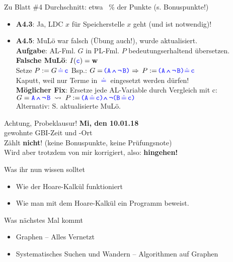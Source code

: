 \begin{frame}{Zu Blatt \#4}
	Durchschnitt: \quad etwa ~\% der Punkte (s. Bonuspunkte!)
	\begin{itemize}
		\item \textbf{A4.3}: Ja, LDC $x$ für Speicherstelle $x$ geht (und ist notwendig)!
		\item \textbf{A4.5}: MuLö war falsch (Übung auch!), wurde aktualisiert. \\
			  \textbf{Aufgabe}: \; AL-Fml. $G$ in PL-Fml. $P$ bedeutungserhaltend übersetzen. \\ 
			  \pause
			  \textbf{Falsche MuLö}: \; $I(\hbox{\textcolor{blue}{\texttt{c}}}) = \hbox{\textbf{w}}$ \\
			  \quad Setze $P := G \pleq \word c$ \qquad Bsp.: \; $G = \plka \word A \aland \alnot \word B \plkz \impl P := \plka \word A \aland \alnot \word B \plkz \pleq \word c$ \\ 
				  \pause 
				  \quad \impl Kaputt, weil nur Terme in $\pleq$ eingesetzt werden dürfen! \\
			  \pause
			  \textbf{Möglicher Fix}: \; Ersetze jede AL-Variable durch Vergleich mit \word c: \\
			  \quad $G = \word A \aland \alnot \word B \; \?> \; P := \plka \word A \pleq \word c\plkz \aland \alnot \plka \word B \pleq \word c\plkz$ \\
			  Alternativ: S. aktualisierte MuLö.
	\end{itemize}
\end{frame}

\begin{frame}{Achtung, Probeklausur!}
	\textbf{Mi, den 10.01.18} \\
	gewohnte GBI-Zeit und -Ort \\
	Zählt \textbf{nicht}! {\small (keine Bonuspunkte, keine Prüfungsnote)}\\
	Wird aber trotzdem von mir korrigiert, also: \textbf{hingehen!} \smiley
\end{frame}



\begin{frame}	
	\begin{block}{Was ihr nun wissen solltet}
		\begin{itemize}
			\item Wie der Hoare-Kalkül funktioniert
			\item Wie man mit dem Hoare-Kalkül ein Programm beweist.
		\end{itemize}
	\end{block}
	
	\begin{block}{Was nächstes Mal kommt}
		\begin{itemize}
			\item Graphen -- Alles Vernetzt
			\item Systematisches Suchen und Wandern -- Algorithmen auf Graphen
		\end{itemize}
	\end{block}
\end{frame}


\slideThanks

